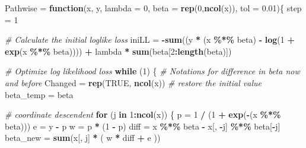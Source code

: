 \documentclass[
]{article}
\newenvironment{Shaded}{\begin{snugshade}}{\end{snugshade}}
\newcommand{\AttributeTok}[1]{\textcolor[rgb]{0.13,0.29,0.53}{#1}}
\newcommand{\CommentTok}[1]{\textcolor[rgb]{0.56,0.35,0.01}{\textit{#1}}}
\newcommand{\ConstantTok}[1]{\textcolor[rgb]{0.56,0.35,0.01}{#1}}
\newcommand{\ControlFlowTok}[1]{\textcolor[rgb]{0.13,0.29,0.53}{\textbf{#1}}}
\newcommand{\DecValTok}[1]{\textcolor[rgb]{0.00,0.00,0.81}{#1}}
\newcommand{\FloatTok}[1]{\textcolor[rgb]{0.00,0.00,0.81}{#1}}
\newcommand{\FunctionTok}[1]{\textcolor[rgb]{0.13,0.29,0.53}{\textbf{#1}}}
\newcommand{\NormalTok}[1]{#1}
\newcommand{\OtherTok}[1]{\textcolor[rgb]{0.56,0.35,0.01}{#1}}
\newcommand{\SpecialCharTok}[1]{\textcolor[rgb]{0.81,0.36,0.00}{\textbf{#1}}}
\begin{document}
\begin{Shaded}
\begin{Highlighting}[]
\NormalTok{Pathwise }\OtherTok{=} \ControlFlowTok{function}\NormalTok{(x, y, }\AttributeTok{lambda =} \DecValTok{0}\NormalTok{, }\AttributeTok{beta =} \FunctionTok{rep}\NormalTok{(}\DecValTok{0}\NormalTok{,}\FunctionTok{ncol}\NormalTok{(x)), }\AttributeTok{tol =} \FloatTok{0.01}\NormalTok{)\{}
\NormalTok{  step }\OtherTok{=} \DecValTok{1}
  
  \CommentTok{\# Calculate the initial loglike loss}
\NormalTok{  iniLL }\OtherTok{=} \SpecialCharTok{{-}}\FunctionTok{sum}\NormalTok{((y }\SpecialCharTok{*}\NormalTok{ (x }\SpecialCharTok{\%*\%}\NormalTok{ beta) }\SpecialCharTok{{-}} \FunctionTok{log}\NormalTok{(}\DecValTok{1} \SpecialCharTok{+} \FunctionTok{exp}\NormalTok{(x }\SpecialCharTok{\%*\%}\NormalTok{ beta)))) }\SpecialCharTok{+}\NormalTok{ lambda }\SpecialCharTok{*} \FunctionTok{sum}\NormalTok{(beta[}\DecValTok{2}\SpecialCharTok{:}\FunctionTok{length}\NormalTok{(beta)])}
  
  \CommentTok{\# Optimize log likelihood loss}
  \ControlFlowTok{while}\NormalTok{ (}\DecValTok{1}\NormalTok{) \{}
    \CommentTok{\# Notations for difference in beta now and before}
\NormalTok{    Changed }\OtherTok{=} \FunctionTok{rep}\NormalTok{(}\ConstantTok{TRUE}\NormalTok{, }\FunctionTok{ncol}\NormalTok{(x))}
    \CommentTok{\# restore the initial value}
\NormalTok{    beta\_temp }\OtherTok{=}\NormalTok{ beta}
    
    \CommentTok{\# coordinate descendent}
    \ControlFlowTok{for}\NormalTok{ (j }\ControlFlowTok{in} \DecValTok{1}\SpecialCharTok{:}\FunctionTok{ncol}\NormalTok{(x)) \{}
\NormalTok{      p }\OtherTok{=} \DecValTok{1} \SpecialCharTok{/}\NormalTok{ (}\DecValTok{1} \SpecialCharTok{+} \FunctionTok{exp}\NormalTok{(}\SpecialCharTok{{-}}\NormalTok{(x }\SpecialCharTok{\%*\%}\NormalTok{ beta)))}
\NormalTok{      e }\OtherTok{=}\NormalTok{ y }\SpecialCharTok{{-}}\NormalTok{ p }
\NormalTok{      w }\OtherTok{=}\NormalTok{ p }\SpecialCharTok{*}\NormalTok{ (}\DecValTok{1} \SpecialCharTok{{-}}\NormalTok{ p)}
\NormalTok{      diff }\OtherTok{=}\NormalTok{ x }\SpecialCharTok{\%*\%}\NormalTok{ beta }\SpecialCharTok{{-}}\NormalTok{ x[, }\SpecialCharTok{{-}}\NormalTok{j] }\SpecialCharTok{\%*\%}\NormalTok{ beta[}\SpecialCharTok{{-}}\NormalTok{j]}
\NormalTok{      beta\_new }\OtherTok{=} \FunctionTok{sum}\NormalTok{(x[, j] }\SpecialCharTok{*}\NormalTok{ ( w }\SpecialCharTok{*}\NormalTok{ diff }\SpecialCharTok{+}\NormalTok{ e )) }
      

\end{Highlighting}
\end{Shaded}
\end{document}
